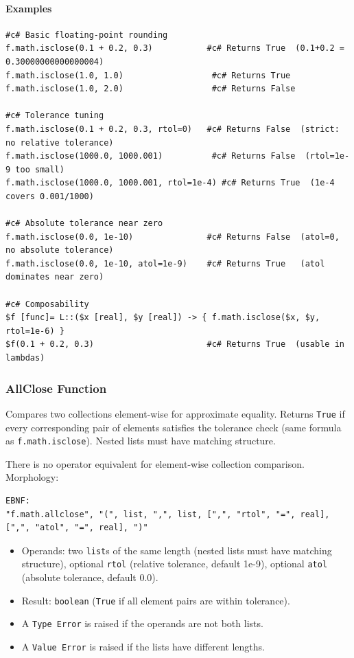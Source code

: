 \paragraph{Examples}
\begin{verbatim}
#c# Basic floating-point rounding
f.math.isclose(0.1 + 0.2, 0.3)           #c# Returns True  (0.1+0.2 = 0.30000000000000004)
f.math.isclose(1.0, 1.0)                  #c# Returns True
f.math.isclose(1.0, 2.0)                  #c# Returns False

#c# Tolerance tuning
f.math.isclose(0.1 + 0.2, 0.3, rtol=0)   #c# Returns False  (strict: no relative tolerance)
f.math.isclose(1000.0, 1000.001)          #c# Returns False  (rtol=1e-9 too small)
f.math.isclose(1000.0, 1000.001, rtol=1e-4) #c# Returns True  (1e-4 covers 0.001/1000)

#c# Absolute tolerance near zero
f.math.isclose(0.0, 1e-10)               #c# Returns False  (atol=0, no absolute tolerance)
f.math.isclose(0.0, 1e-10, atol=1e-9)    #c# Returns True   (atol dominates near zero)

#c# Composability
$f [func]= L::($x [real], $y [real]) -> { f.math.isclose($x, $y, rtol=1e-6) }
$f(0.1 + 0.2, 0.3)                       #c# Returns True  (usable in lambdas)
\end{verbatim}

\subsubsection{AllClose Function}
\label{sec:allclose}
Compares two collections element-wise for approximate equality. Returns \texttt{True} if every corresponding pair of elements satisfies the tolerance check (same formula as \texttt{f.math.isclose}). Nested lists must have matching structure.

There is no operator equivalent for element-wise collection comparison.\\
Morphology:
\begin{verbatim}
EBNF:
"f.math.allclose", "(", list, ",", list, [",", "rtol", "=", real], [",", "atol", "=", real], ")"
\end{verbatim}
\begin{itemize}
\item Operands: two \texttt{list}s of the same length (nested lists must have matching structure), optional \texttt{rtol} (relative tolerance, default 1e-9), optional \texttt{atol} (absolute tolerance, default 0.0).
\item Result: \texttt{boolean} (\texttt{True} if all element pairs are within tolerance).
\item A \texttt{Type Error} is raised if the operands are not both lists.
\item A \texttt{Value Error} is raised if the lists have different lengths.
\end{itemize}


